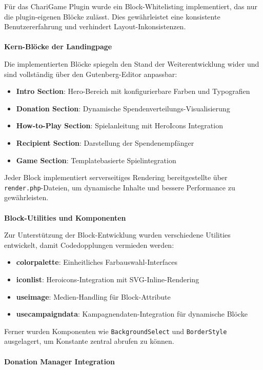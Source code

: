 Für das ChariGame Plugin wurde ein Block-Whitelisting implementiert, das nur die plugin-eigenen Blöcke zulässt.
Dies gewährleistet eine konsistente Benutzererfahrung und verhindert Layout-Inkonsistenzen.
\\\\
\textbf{Kern-Blöcke der Landingpage}

Die implementierten Blöcke spiegeln den Stand der Weiterentwicklung wider und sind vollständig über den Gutenberg-Editor anpassbar:

\begin{itemize}
    \item \textbf{Intro Section}: Hero-Bereich mit konfigurierbare Farben und Typografien
    \item \textbf{Donation Section}: Dynamische Spendenverteilungs-Visualisierung
    \item \textbf{How-to-Play Section}: Spielanleitung mit HeroIcons Integration
    \item \textbf{Recipient Section}: Darstellung der Spendenempfänger
    \item \textbf{Game Section}: Templatebasierte Spielintegration
\end{itemize}

Jeder Block implementiert serverseitiges Rendering bereitgestellte über \texttt{render.php}-Dateien, um dynamische Inhalte und bessere Performance zu gewährleisten.
\\\\
\textbf{Block-Utilities und Komponenten}

Zur Unterstützung der Block-Entwicklung wurden verschiedene Utilities entwickelt, damit Codedopplungen vermieden werden:

\begin{itemize}
    \item \textbf{colorpalette}: Einheitliches Farbauswahl-Interfaces
    \item \textbf{iconlist}: Heroicons-Integration mit SVG-Inline-Rendering
    \item \textbf{useimage}: Medien-Handling für Block-Attribute
    \item \textbf{usecampaigndata}: Kampagnendaten-Integration für dynamische Blöcke
\end{itemize}

Ferner wurden Komponenten wie \texttt{BackgroundSelect} und \texttt{BorderStyle} ausgelagert, um Konstante zentral abrufen zu können.
\\\\
\textbf{Donation Manager Integration}

